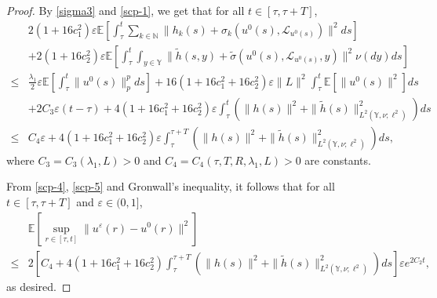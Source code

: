 \documentclass[11pt]{article}
\numberwithin{equation}{section}
\theoremstyle{plain}
\begin{document}
\begin{proof}
  By \eqref{sigma3} and \eqref{scp-1}, we get that for all $t \in [\tau, \tau+T]$,
  \begin{align}\label{scp-5}
         &2(1+16c_1^2) \varepsilon \mathbb{E}
              \left[ \int_{\tau}^{t}
                        \sum_{k \in \mathbb{N} }
                             \| h_k(s) + \sigma_k(u^0(s), \mathcal{L}_{u^0(s)}) \|^2 ds
              \right]  \nonumber \\
         & + 2(1+16c_2^2) \varepsilon \mathbb{E}
               \left[ \int_{\tau}^{t}  
                            \int_{y \in \mathbb{Y} }
                                 \| \widetilde{h}(s,y) 
                                    + \widetilde{\sigma}(u^0(s), \mathcal{L}_{u^0(s)},y) \|^2
                       \nu(dy) ds
               \right]  \nonumber \\
    \le & \frac{\lambda_1}{2} \varepsilon
              \mathbb{E} \left[ \int_{\tau}^{t} \| u^0(s) \|^p_p ds \right]
           + 16 \left( 1 + 16c_1^2 + 16c_2^2 \right) \varepsilon \|L\|^2
                  \int_{\tau}^{t} \mathbb{E} \left[ \|u^0(s)\|^2 \right]
                  ds  \nonumber\\
         & + 2 C_3 \varepsilon (t - \tau)  
             + 4 (1 + 16c_1^2 + 16c_2^2) \varepsilon 
                       \int_{\tau}^{t}
                           \left( \| h(s) \|^2 + \| \widetilde{h}(s) \|_{L^2(\mathbb{Y}, \nu; \ell^2) }^2
                           \right) ds  \nonumber \\                
    \le &C_4  \varepsilon
             + 4 (1 + 16c_1^2 + 16c_2^2) \varepsilon 
                        \int_{\tau}^{\tau+T}
                            \left( \| h(s) \|^2 + \| \widetilde{h}(s) \|_{L^2(\mathbb{Y}, \nu; \ell^2) }^2
                            \right) ds,
  \end{align}
  where $C_3 = C_3(\lambda_1, L) > 0$ and $C_4 = C_4(\tau, T, R, \lambda_1, L)>0 $ are constants.
 
  From \eqref{scp-4}, \eqref{scp-5} and Gronwall's inequality,
  it follows that for all $t \in [\tau, \tau+T]$ and $\varepsilon \in (0,1]$,
  \begin{align*}
         & \mathbb{E} \left[ \sup_{r \in [\tau, t]} \| u^\varepsilon(r) - u^0(r) \|^2 \right]  \nonumber\\
    \le &2 \left[ C_4  
                                 + 4 (1 + 16c_1^2 + 16c_2^2)
                                     \int_{\tau}^{\tau+T}
                                         \left( \| h(s) \|^2
                                                  + \| \widetilde{h}(s) \|_{L^2(\mathbb{Y}, \nu; \ell^2) }^2
                                        \right) ds
                \right] \varepsilon e^{2 C_2 t},
  \end{align*}
  as desired.
 \end{proof}
  
\end{document}
